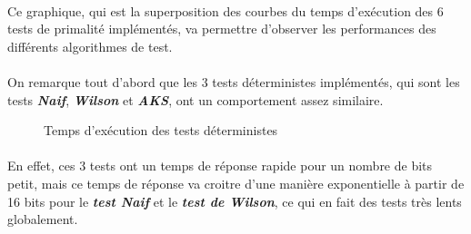 			\paragraph{} Ce graphique, qui est la superposition des courbes du temps d'exécution des 6 tests de primalité implémentés, va permettre d'observer les performances des différents algorithmes de test.
			\paragraph{} On remarque tout d'abord que les 3 tests déterministes implémentés, qui sont les tests \textit{\textbf{Naif}}, \textit{\textbf{Wilson}} et \textit{\textbf{AKS}}, ont un comportement assez similaire.
			
			\begin{figure}[H]\vspace{-1em}\caption{Temps d'exécution des tests déterministes}\label{fig:M5}\end{figure}
			
			\paragraph{} En effet, ces 3 tests ont un temps de réponse rapide pour un nombre de bits petit, mais ce temps de réponse va croitre d'une manière exponentielle à partir de 16 bits pour le \textit{\textbf{test Naif}} et le \textit{\textbf{test de Wilson}}, ce qui en fait des tests très lents globalement. 
			
